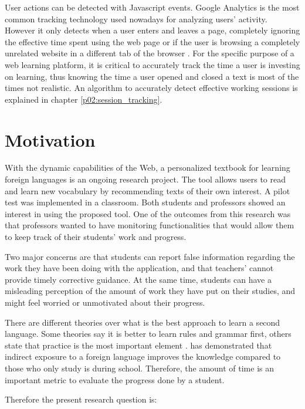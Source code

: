 User actions can be detected with Javascript events. Google Analytics is the most common tracking technology used nowadays for analyzing users' activity. However it only detects when a user enters and leaves a page, completely ignoring the effective time spent using the web page or if the user is browsing a completely unrelated website in a different tab of the browser \cite{GoogleAnalytics01} \cite{MisunderstoodMetrics}. For the specific purpose of a web learning platform, it is critical to accurately track the time a user is investing on learning, thus knowing the time a user opened and closed a text is most of the times not realistic. An algorithm to accurately detect effective working sessions is explained in chapter \ref{p02:session_tracking}.

\section{Motivation}
With the dynamic capabilities of the Web, a personalized textbook for learning foreign languages \cite{Mircea2018} is an ongoing research project. The tool allows users to read and learn new vocabulary by recommending texts of their own interest. A pilot test was implemented in a classroom. Both students and professors showed an interest in using the proposed tool. One of the outcomes from this research was that professors wanted to have monitoring functionalities that would allow them to keep track of their students' work and progress.

Two major concerns are that students can report false information regarding the work they have been doing with the application, and that teachers' cannot provide timely corrective guidance. At the same time, students can have a misleading perception of the amount of work they have put on their studies, and might feel worried or unmotivated about their progress.

There are different theories over what is the best approach to learn a second language. Some theories say it is better to learn rules and grammar first, others state that practice is the most important element \cite{Ellis1993}. \citeauthor{Kuppens2010} has demonstrated that indirect exposure to a foreign language improves the knowledge compared to those who only study is during school. Therefore, the amount of time is an important metric to evaluate the progress done by a student.

Therefore the present research question is: \\

